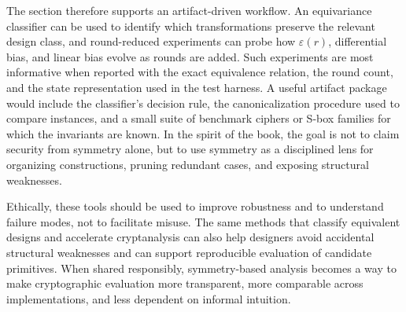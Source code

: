 \documentclass[11pt]{article}
\begin{document}
The section therefore supports an artifact-driven workflow. An equivariance classifier can be used to identify which transformations preserve the relevant design class, and round-reduced experiments can probe how $\varepsilon(r)$, differential bias, and linear bias evolve as rounds are added. Such experiments are most informative when reported with the exact equivalence relation, the round count, and the state representation used in the test harness. A useful artifact package would include the classifier's decision rule, the canonicalization procedure used to compare instances, and a small suite of benchmark ciphers or S-box families for which the invariants are known. In the spirit of the book, the goal is not to claim security from symmetry alone, but to use symmetry as a disciplined lens for organizing constructions, pruning redundant cases, and exposing structural weaknesses.

Ethically, these tools should be used to improve robustness and to understand failure modes, not to facilitate misuse. The same methods that classify equivalent designs and accelerate cryptanalysis can also help designers avoid accidental structural weaknesses and can support reproducible evaluation of candidate primitives. When shared responsibly, symmetry-based analysis becomes a way to make cryptographic evaluation more transparent, more comparable across implementations, and less dependent on informal intuition.
\end{document}
